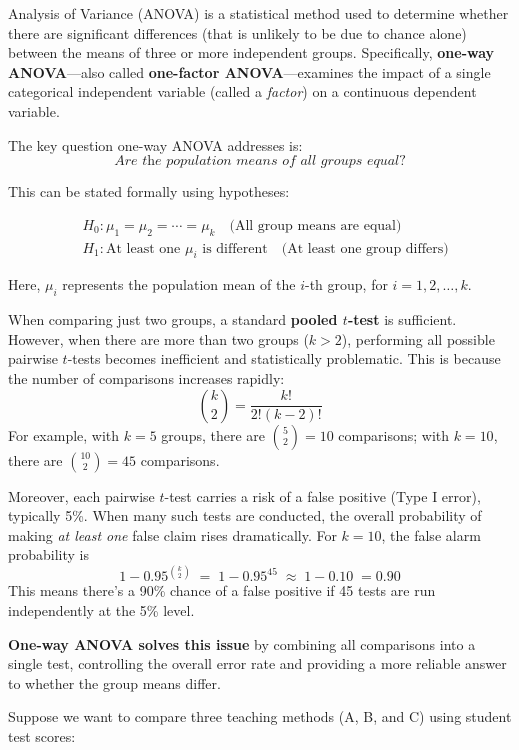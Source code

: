\documentclass[twoside]{book}
\begin{document}
Analysis of Variance (ANOVA) is a statistical method used to determine whether there are significant differences (that is unlikely to be due to chance alone) between the means of three or more independent groups. Specifically, \textbf{one-way ANOVA}—also called \textbf{one-factor ANOVA}—examines the impact of a single categorical independent variable (called a \textit{factor}) on a continuous dependent variable.

The key question one-way ANOVA addresses is:
\[
\textit{Are the population means of all groups equal?}
\]

This can be stated formally using hypotheses:
\begin{textbox}
\begin{align*}
&H_0: \mu_1 = \mu_2 = \cdots = \mu_k \quad \text{(All group means are equal)}\\
&H_1: \text{At least one } \mu_i \text{ is different} \quad \text{(At least one group differs)}
\end{align*}
\end{textbox}
Here, $\mu_i$ represents the population mean of the $i$-th group, for $i = 1, 2, \dots, k$.

When comparing just two groups, a standard \textbf{pooled $t$-test} is sufficient. However, when there are more than two groups ($k > 2$), performing all possible pairwise $t$-tests becomes inefficient and statistically problematic. This is because the number of comparisons increases rapidly:
\[
\binom{k}{2} = \dfrac{k!}{2!(k-2)!}
\]
For example, with \(k = 5\) groups, there are \(\binom{5}{2} = 10\) comparisons; with \(k = 10\), there are \(\binom{10}{2} = 45\) comparisons.

Moreover, each pairwise $t$-test carries a risk of a false positive (Type I error), typically 5\%. When many such tests are conducted, the overall probability of making \textit{at least one} false claim rises dramatically. For $k=10$, the false alarm probability is
\[
1 - 0.95^{\binom{k}{2}} \;=\; 1 - 0.95^{45} \;\approx\; 1 - 0.10 \;= 0.90
\]
This means there's a 90\% chance of a false positive if 45 tests are run independently at the 5\% level.

\textbf{One-way ANOVA solves this issue} by combining all comparisons into a single test, controlling the overall error rate and providing a more reliable answer to whether the group means differ.

\vspace{0.5em}
\noindent
Suppose we want to compare three teaching methods (A, B, and C) using student test scores:
\end{document}
